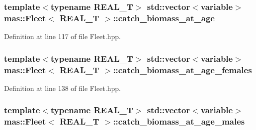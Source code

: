 \hypertarget{structmas_1_1_fleet_a6bcc185d0581e22288665272df90d8a0}{
\subsubsection[{catch\-\_\-biomass\-\_\-at\-\_\-age}]{\setlength{\rightskip}{0pt plus 5cm}template$<$typename R\-E\-A\-L\-\_\-\-T$>$ std\-::vector$<${\bf variable}$>$ {\bf mas\-::\-Fleet}$<$ R\-E\-A\-L\-\_\-\-T $>$\-::catch\-\_\-biomass\-\_\-at\-\_\-age}}\label{structmas_1_1_fleet_a6bcc185d0581e22288665272df90d8a0}


Definition at line 117 of file Fleet.\-hpp.

\hypertarget{structmas_1_1_fleet_ae892beaea7811cf46a6b5e8f2e2a3912}{
\subsubsection[{catch\-\_\-biomass\-\_\-at\-\_\-age\-\_\-females}]{\setlength{\rightskip}{0pt plus 5cm}template$<$typename R\-E\-A\-L\-\_\-\-T$>$ std\-::vector$<${\bf variable}$>$ {\bf mas\-::\-Fleet}$<$ R\-E\-A\-L\-\_\-\-T $>$\-::catch\-\_\-biomass\-\_\-at\-\_\-age\-\_\-females}}\label{structmas_1_1_fleet_ae892beaea7811cf46a6b5e8f2e2a3912}


Definition at line 138 of file Fleet.\-hpp.

\hypertarget{structmas_1_1_fleet_a21e595437d97bf9d2197cf2bdddcc7a0}{
\subsubsection[{catch\-\_\-biomass\-\_\-at\-\_\-age\-\_\-males}]{\setlength{\rightskip}{0pt plus 5cm}template$<$typename R\-E\-A\-L\-\_\-\-T$>$ std\-::vector$<${\bf variable}$>$ {\bf mas\-::\-Fleet}$<$ R\-E\-A\-L\-\_\-\-T $>$\-::catch\-\_\-biomass\-\_\-at\-\_\-age\-\_\-males}}\label{structmas_1_1_fleet_a21e595437d97bf9d2197cf2bdddcc7a0}


